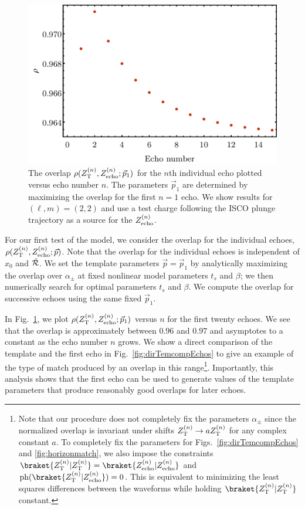 \begin{refsection}
\begin{figure}[t]
\includegraphics[width = 1 \columnwidth]{chapter_echo/etc/rhovsechonumberV2}
\caption{ The overlap $\rho(Z_{\rm T}^{(n)}, Z_{\rm echo}^{(n)}; \vec p_1)$ for the $n$th individual echo  plotted versus echo number $n$. 
The parameters $\vec p_1$ are determined by maximizing the overlap for the first $n=1$ echo. We show results for $(\ell,m)=(2,2)$ and use a test charge following the ISCO plunge trajectory as a source for the $Z_{\rm echo}^{(n)}$.
}
\label{fig:rho2vsecho}
\end{figure}

For our first test of the model, we consider the overlap for the individual echoes, $\rho(Z_{\rm T}^{(n)},Z_{\rm echo}^{(n)}; \vec p)$. 
Note that the overlap for the individual echoes is independent of $x_0$ and $\tilde{\mathcal R}$.
We set the template parameters $\vec p =\vec p_1$ by analytically maximizing the overlap over $\alpha_\pm$ \cite{Zimmerman:2011dx} at fixed nonlinear model parameters $t_s$ and $\beta$; we then numerically search for optimal parameters $t_s$ and $\beta$.
We compute the overlap for successive echoes using the same fixed $\vec p_1$.

In Fig.~\ref{fig:rho2vsecho}, 
we plot $\rho(Z_{\rm T}^{(n)},Z_{\rm echo}^{(n)}; \vec p_1)$
versus $n$ for the first twenty echoes. 
We see that the overlap is approximately between $0.96$ and $0.97$ and asymptotes to a constant as the echo number $n$ grows. 
We show a direct comparison of the template and the first echo in Fig.~\ref{fig:dirTemcompEchos} to give an example of the type of match produced by an overlap in this range\footnote{
Note that our procedure does not completely fix the parameters $\alpha_\pm$ since the normalized overlap is invariant under shifts $Z_{\rm T}^{(n)}\to a Z_{\rm T}^{(n)}$ for any complex constant $a$. To completely fix the parameters for Figs.~\ref{fig:dirTemcompEchos} and \ref{fig:horizonmatch}, we also impose the constraints $\braket{Z_{\rm T}^{(n)}|Z_{\rm T}^{(n)}}=\braket{Z_{\rm echo}^{(n)}|Z_{\rm echo}^{(n)}}$ and ${\rm ph}(\braket{Z_{\rm T}^{(n)}|Z_{\rm echo}^{(n)}})=0$. This is equivalent to minimizing the least squares differences between the waveforms while holding $\braket{Z_{\rm T}^{(n)}|Z_{\rm T}^{(n)}}$ constant.
}. 
Importantly, this analysis shows that the first echo can be used to generate values of the template parameters that produce reasonably good overlaps for later echoes. 


\end{refsection}
